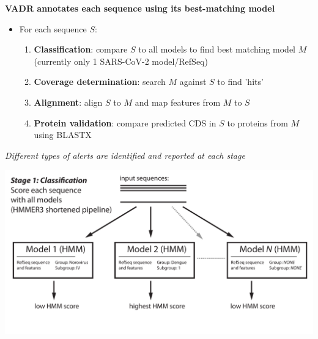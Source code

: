 \documentclass[landscape]{slides}
\begin{document}
\begin{slide}
\begin{center}
\textbf{VADR annotates each sequence using its best-matching model}

\begin{itemize}
\item For each sequence $S$:
\small
\begin{enumerate}
\item \textbf{Classification}: compare $S$ to all models to find best
  matching model $M$ (currently only 1 SARS-CoV-2 model/RefSeq)
\item \textbf{Coverage determination}: search $M$ against $S$ to find 'hits'
\item \textbf{Alignment}: align $S$ to $M$ and map features from $M$ to $S$
\item \textbf{Protein validation}: compare predicted CDS in $S$ to proteins
  from $M$ using BLASTX
\end{enumerate}
\end{itemize}

\emph{Different types of alerts are identified and reported at each stage}

\end{center}

\vfill
\end{slide}
\begin{slide}
\begin{center}

\includegraphics[width=9.5in]{figs/v-annotate-stage1-1}

\end{center}
\vfill
\end{slide}
\end{document}
